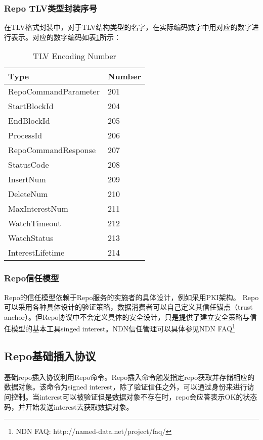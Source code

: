 \subsubsection{Repo TLV类型封装序号}
在TLV格式封装中，对于TLV结构类型的名字，在实际编码数字中用对应的数字进行表示。对应的数字编码如表\ref{tab:tlv-encoding}所示：

\begin{table}[h]
\centering
\caption{TLV Encoding Number}
\label{tab:tlv-encoding}
\begin{tabular}{|l|l|}
\hline
\textbf{Type} & \textbf{Number} \\ \hline
RepoCommandParameter & 201 \\ \hline
StartBlockId & 204 \\ \hline
EndBlockId & 205 \\ \hline
ProcessId & 206 \\ \hline
RepoCommandResponse & 207 \\ \hline
StatusCode & 208 \\ \hline
InsertNum & 209 \\ \hline
DeleteNum & 210 \\ \hline
MaxInterestNum & 211 \\ \hline
WatchTimeout & 212 \\ \hline
WatchStatus & 213 \\ \hline
InterestLifetime & 214 \\ \hline
\end{tabular}
\end{table}

\subsubsection{Repo信任模型}
Repo的信任模型依赖于Repo服务的实施者的具体设计，例如采用PKI架构。 Repo可以采用各种具体设计的验证策略，数据消费者可以自己定义其信任锚点（trust anchor）。但Repo协议中不会定义具体的安全设计，只是提供了建立安全策略与信任模型的基本工具singed interest。NDN信任管理可以具体参见NDN FAQ\footnote{NDN FAQ: http://named-data.net/project/faq/}

\subsection{Repo基础插入协议}
基础repo插入协议利用Repo命令。Repo插入命令触发指定repo获取并存储相应的数据对象。该命令为signed interest，除了验证信任之外，可以通过身份来进行访问控制。当interest可以被验证但是数据对象不存在时，repo会应答表示OK的状态码，并开始发送interest去获取数据对象。


